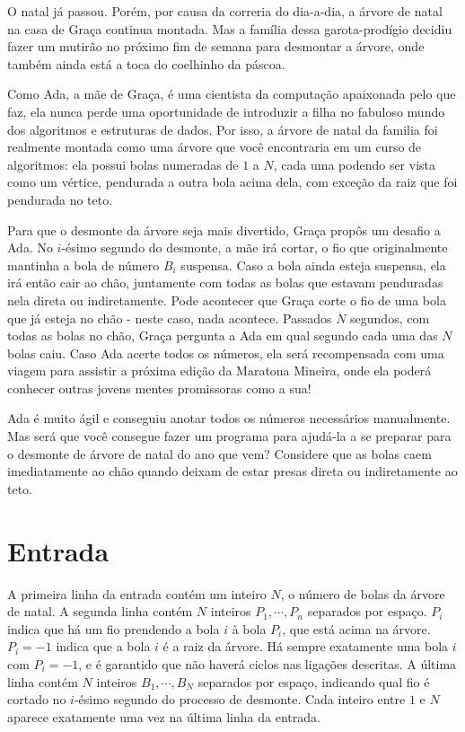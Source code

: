 O natal já passou. Porém, por causa da correria do dia-a-dia, a árvore de natal na casa de Graça continua montada.
Mas a família dessa garota-prodígio decidiu fazer um mutirão no próximo fim de semana para desmontar a árvore,
onde também ainda está a toca do coelhinho da páscoa.

Como Ada, a mãe de Graça, é uma cientista da computação apaixonada pelo que faz,
ela nunca perde uma oportunidade de introduzir a filha
no fabuloso mundo dos algoritmos e estruturas de dados.
Por isso, a árvore de natal da familia foi realmente montada como uma árvore
que você encontraria em um curso de algoritmos: ela possui bolas numeradas de $1$ a $N$, cada uma
podendo ser vista como um vértice, pendurada a outra bola acima dela,
com exceção da raiz que foi pendurada no teto.

Para que o desmonte da árvore seja mais divertido, Graça propôs um desafio a Ada.
No $i$-ésimo segundo do desmonte, a mãe irá cortar, o fio que originalmente mantinha a bola de número $B_i$ suspensa.
Caso a bola ainda esteja suspensa, ela irá então cair ao chão, juntamente com todas as bolas que estavam
penduradas nela direta ou indiretamente.
Pode acontecer que Graça corte o fio de uma bola que já esteja no chão - neste caso, nada acontece.
Passados $N$ segundos, com todas as bolas no chão, Graça pergunta a Ada em qual segundo cada uma das $N$
bolas caiu. Caso Ada acerte todos os números, ela será recompensada com uma viagem para assistir a próxima
edição da Maratona Mineira, onde ela poderá conhecer outras jovens mentes promissoras como a sua!

Ada é muito ágil e conseguiu anotar todos os números necessários manualmente. Mas será que você
consegue fazer um programa para ajudá-la a se preparar para o desmonte de árvore de natal do ano que vem?
Considere que as bolas caem imediatamente ao chão quando deixam de estar presas direta ou indiretamente ao teto.

\section*{Entrada}

A primeira linha da entrada contém um inteiro $N$, o número de bolas da árvore de natal.
A segunda linha contém $N$ inteiros $P_1, \cdots, P_n$ separados por espaço.
$P_i$ indica que há um fio prendendo a bola $i$ à bola $P_i$, que está acima na árvore.
$P_i = -1$ indica que a bola $i$ é a raiz da árvore. Há sempre exatamente uma bola $i$ com 
$P_i = -1$, e é garantido que não haverá ciclos nas ligações descritas.
A última linha contém $N$ inteiros $B_1, \cdots, B_N$ separados por espaço, indicando qual fio é
cortado no $i$-ésimo segundo do processo de desmonte.
Cada inteiro entre $1$ e $N$ aparece exatamente uma vez na última linha da entrada.

